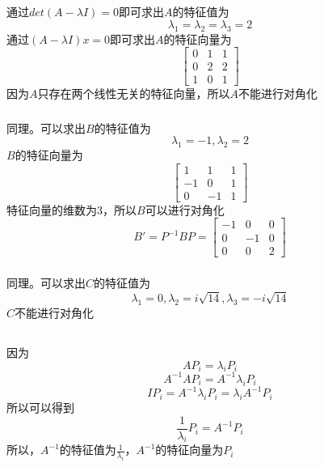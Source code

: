 \documentclass[onecolumn,oneside]{SUSTechHomework}
\begin{document}
  \section{}
  \subsection{}
  \subsubsection{}
  通过\(det(A-\lambda I) = 0\)即可求出\(A\)的特征值为
  \[
  \lambda_1 = \lambda_2 = \lambda_3 = 2
  \]
  通过\((A-\lambda I)x = 0\)即可求出\(A\)的特征向量为
  \[
     \begin{bmatrix}
      0 & 1 & 1 \\ 0 & 2 & 2 \\ 1 & 0 & 1
     \end{bmatrix}
  \]
  因为\(A\)只存在两个线性无关的特征向量，所以\(A\)不能进行对角化

  \subsubsection{}
  同理。可以求出\(B\)的特征值为
  \[
     \lambda_1 = -1 , \lambda_2 = 2
  \]
  \(B\)的特征向量为
  \[
     \begin{bmatrix}
      1 & 1 & 1 \\ -1 & 0 & 1 \\ 0 & -1 & 1
     \end{bmatrix}
  \]
  特征向量的维数为3，所以\(B\)可以进行对角化
  \[
     B' = P^{-1}BP = \begin{bmatrix}
      -1 & 0 & 0 \\ 0 & -1 & 0 \\ 0 & 0 & 2
     \end{bmatrix}
  \]

  \subsubsection{}
  同理。可以求出\(C\)的特征值为
  \[
     \lambda_1 = 0 , \lambda_2 = i\sqrt{14}, \lambda_3 = -i\sqrt{14}
  \]
  \(C\)不能进行对角化
  
  \subsection{}
  因为
  \[ AP_i = \lambda_i P_i \]
  \[ A^{-1}AP_i = A^{-1}\lambda_i P_i \] 
  \[ IP_i = A^{-1}\lambda_i P_i = \lambda_i A^{-1}P_i \]
  所以可以得到
  \[
     \frac{1}{\lambda_i} P_i = A^{-1}P_i
  \]
  所以，\(A^{-1}\)的特征值为\(\frac{1}{\lambda_i}\)，\(A^{-1}\)的特征向量为\(P_i\)
\end{document}

